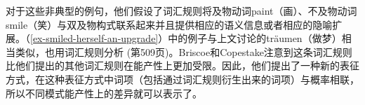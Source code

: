 \zl
对于这些非典型的例句，他们假设了词汇规则将及物动词paint（画）、不及物动词smile（笑）与双及物构式联系起来并且提供相应的语义信息或者相应的隐喻扩展。（\ref{ex-smiled-herself-an-upgrade}）中的例子与上文讨论的träumen（做梦）相当类似，也用词汇规则分析 (第509页)。Briscoe和Copestake注意到这条词汇规则比他们提出的其他词汇规则在能产性上更加受限。因此，他们提出了一种新的表征方式，在这种表征方式中词项（包括通过词汇规则衍生出来的词项）与概率相联，所以不同模式能产性上的差异就可以表示了。

